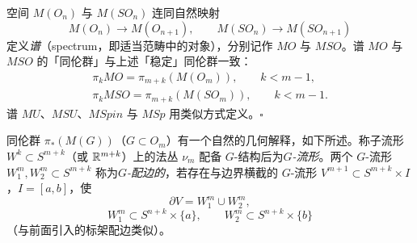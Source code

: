 \begin{remark}{}
空间 $M(O_n)$ 与 $M(SO_n)$ 连同自然映射
\[
  M(O_n)\to M(O_{n+1}),\qquad M(SO_n)\to M(SO_{n+1})
\]
定义\emph{谱}（spectrum，即适当范畴中的对象），分别记作 $MO$ 与 $MSO$。谱 $MO$ 与 $MSO$ 的「同伦群」与上述「稳定」同伦群一致：
\[
\begin{gathered}
  \pi_kMO=\pi_{m+k}(M(O_m)),\qquad k<m-1,\\
  \pi_kMSO=\pi_{m+k}(M(SO_m)),\qquad k<m-1.
\end{gathered}
\]
谱 $MU$、$MSU$、$MSpin$ 与 $MSp$ 用类似方式定义。\hfill$\square$
\end{remark}

同伦群 $\pi_*(M(G))$（$G\subset O_m$）有一个自然的几何解释，如下所述。称子流形 $W^k\subset S^{m+k}$（或 $\mathbb{R}^{m+k}$）上的法丛 $\nu_m$ 配备 $G$-结构后为\emph{$G$-流形}。两个 $G$-流形 $W^m_1,W^m_2\subset S^{m+k}$ 称为\emph{$G$-配边的}，若存在与边界横截的 $G$-流形 $V^{m+1}\subset S^{m+k}\times I$，$I=[a,b]$，使
\[
  \partial V=W^m_1\cup W^m_2,
\]
\[
  W^m_1\subset S^{n+k}\times\{a\},\qquad W^m_2\subset S^{n+k}\times\{b\}
\]
（与前面引入的标架配边类似）。

